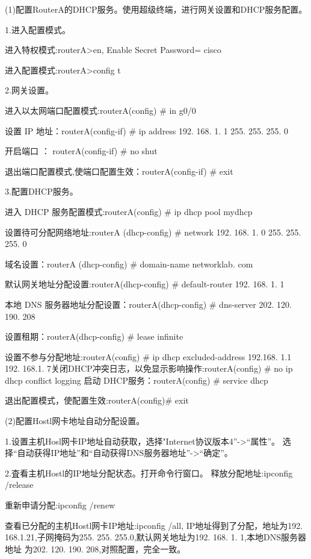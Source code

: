 \documentclass[lang=cn,11pt,a4paper,cite=authoryear]{elegantpaper}
\begin{document}
(1)配置RouterA的DHCP服务。使用超级终端，进行网关设置和DHCP服务配置。

1.进入配置模式。

进入特权模式:routerA>en, Enable Secret Password= cisco

进入配置模式:routerA>config t

2.网关设置。

进入以太网端口配置模式:routerA(config) \# in g0/0

设置 IP 地址：routerA(config-if) \# ip address 192. 168. 1. 1 255. 255. 255. 0

开启端口 ： routerA(config-if) \# no shut

退出端口配置模式,使端口配置生效：routerA(config-if) \# exit

3.配置DHCP服务。

进入 DHCP 服务配置模式:routerA(config) \# ip dhcp pool mydhcp

设置待可分配网络地址:routerA (dhcp-config) \# network 192. 168. 1. 0 255. 255. 255. 0

域名设置：routerA (dhcp-config) \# domain-name networklab. com

默认网关地址分配设置:routerA(dhcp-config) \# default-router 192. 168. 1. 1

本地 DNS 服务器地址分配设置：routerA(dhcp-config) \# dns-server 202. 120. 190. 208

设置租期：routerA(dhcp-config) \# lease infinite

设置不参与分配地址:routerA(config) \# ip dhcp excluded-address 192.168. 1.1 192. 168.1. 7关闭DHCP冲突日志，以免显示影响操作:routerA(config) \# no ip dhcp conflict logging 启动 DHCP服务：routerA(config) \# service dhcp

退出配置模式，使配置生效:routerA(config)\# exit

(2)配置Hostl网卡地址自动分配设置。

1.设置主机Hosl网卡IP地址自动获取，选择"Internet协议版本4”->“属性”。 选择“自动获得IP地址”和“自动获得DNS服务器地址”->“确定”。

2.査看主机Hostl的IP地址分配状态。打开命令行窗口。 释放分配地址:ipconfig /release

重新申请分配:ipconfig /renew

查看已分配的主机Hostl网卡IP地址:ipconfig /all, IP地址得到了分配，地址为192. 168.1.21,子网掩码为255. 255. 255.0,默认网关地址为192. 168. 1. 1,本地DNS服务器地址 为202. 120. 190. 208,对照配置，完全一致。 
\end{document}

